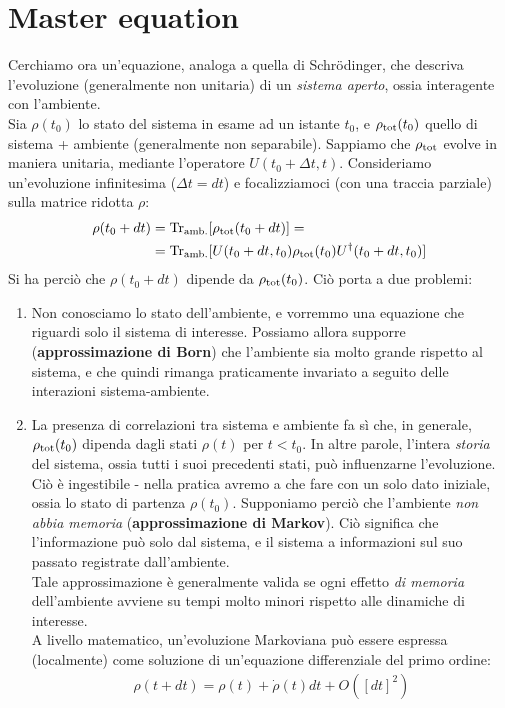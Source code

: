 \documentclass[../../InformazioneQuantistica.tex]{subfiles}
\begin{document}
\section{Master equation}
Cerchiamo ora un'equazione, analoga a quella di Schr\"odinger, che descriva l'evoluzione (generalmente non unitaria) di un \textit{sistema aperto}, ossia interagente con l'ambiente.\\
Sia $\rho(t_0)$ lo stato del sistema in esame ad un istante $t_0$, e $\rho_{\operatorname{tot}}(t_0)$ quello di sistema + ambiente (generalmente non separabile). Sappiamo che $\rho_{\operatorname{tot}}$ evolve in maniera unitaria, mediante l'operatore $U(t_0+\Delta t,t)$. Consideriamo un'evoluzione infinitesima ($\Delta t = dt$) e focalizziamoci (con una traccia parziale) sulla matrice ridotta $\rho$:
\begin{align}
    \rho(t_0+dt) &= \operatorname{Tr}_{\operatorname{amb.}} [\rho_{\operatorname{tot}} (t_0 + dt)] =\\
    &= \operatorname{Tr}_{\operatorname{amb.}} [ U(t_0+dt,t_0)\rho_{\operatorname{tot}}(t_0) U^\dag(t_0+ dt, t_0)]
    \label{eqn:evoluzione-unitaria-generale}
\end{align}
Si ha perciò che $\rho(t_0+dt)$ dipende da $\rho_{\operatorname{tot}}(t_0)$. Ciò porta a due problemi:
\begin{enumerate}
    \item Non conosciamo lo stato dell'ambiente, e vorremmo una equazione che riguardi solo il sistema di interesse. Possiamo allora supporre (\textbf{approssimazione di Born}) che l'ambiente sia molto grande rispetto al sistema, e che quindi rimanga praticamente invariato a seguito delle interazioni sistema-ambiente.
    \item La presenza di correlazioni tra sistema e ambiente fa sì che, in generale, $\rho_{\operatorname{tot}}(t_0)$ dipenda dagli stati $\rho(t)$ per $t<t_0$. In altre parole, l'intera \textit{storia} del sistema, ossia tutti i suoi precedenti stati, può influenzarne l'evoluzione. Ciò è ingestibile - nella pratica avremo a che fare con un solo dato iniziale, ossia lo stato di partenza $\rho(t_0)$. Supponiamo perciò che l'ambiente \textit{non abbia memoria} (\textbf{approssimazione di Markov}). Ciò significa che l'informazione può solo  dal sistema, e il sistema  a informazioni sul suo passato registrate dall'ambiente.\\
    Tale approssimazione è generalmente valida se ogni effetto \textit{di memoria} dell'ambiente avviene su tempi molto minori rispetto alle dinamiche di interesse.\\
    A livello matematico, un'evoluzione Markoviana può essere espressa (localmente) come soluzione di un'equazione differenziale del primo ordine:
    \begin{align}
        \rho(t+dt) = \rho(t) + \dot{\rho}(t) dt + O([dt]^2)
        \label{eqn:markov-expansion}
    \end{align}
\end{enumerate}
\end{document}
